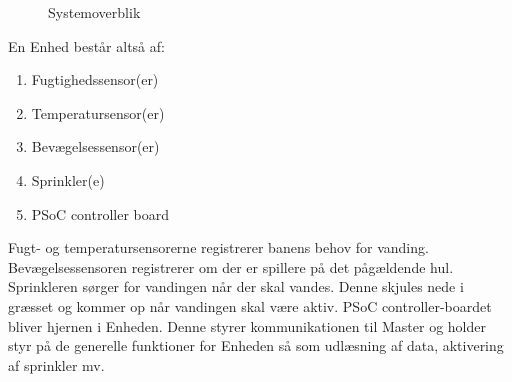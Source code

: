 \begin{figure}[ht] \centering
{}
\caption{Systemoverblik}
\label{fig:bloksystemoverblik}
\end{figure}

En Enhed består altså af:
\begin{enumerate}
\item Fugtighedssensor(er)
\item Temperatursensor(er)
\item Bevægelsessensor(er) 
\item Sprinkler(e)
\item PSoC controller board
\end{enumerate}

Fugt- og temperatursensorerne registrerer banens behov for vanding. Bevægelsessensoren registrerer om der er spillere på det pågældende hul. Sprinkleren sørger for vandingen når der skal vandes. Denne skjules nede i græsset og kommer op når vandingen skal være aktiv.
PSoC controller-boardet bliver hjernen i Enheden. Denne styrer kommunikationen til Master og holder styr på de generelle funktioner for Enheden så som udlæsning af data, aktivering af sprinkler mv.